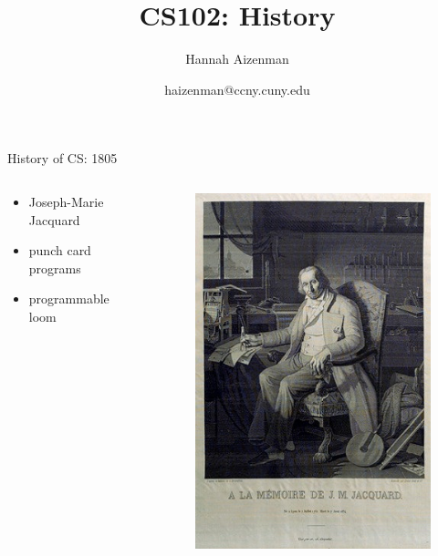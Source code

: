 \documentclass[xcolor={dvipsnames}]{beamer}
\begin{document}
\title{ CS102: History}
\author{Hannah Aizenman}
\date{haizenman@ccny.cuny.edu}


\begin{frame}
	\titlepage
\end{frame}

\begin{frame}{History of CS: 1805}
	\begin{columns}
	 \begin{column}{.49\textwidth}
	\begin{itemize}
	\item Joseph-Marie Jacquard
	\item punch card programs
	\item programmable loom
	\end{itemize}
 	\end{column}
	 \begin{column}{.49\textwidth}
  		\begin{figure}
 		\includegraphics[scale=0.5]{Jacquard_Joseph_Marie_woven_silk}
		\end{figure}
	\end{column}
\end{columns}
\end{frame}
\end{document}
